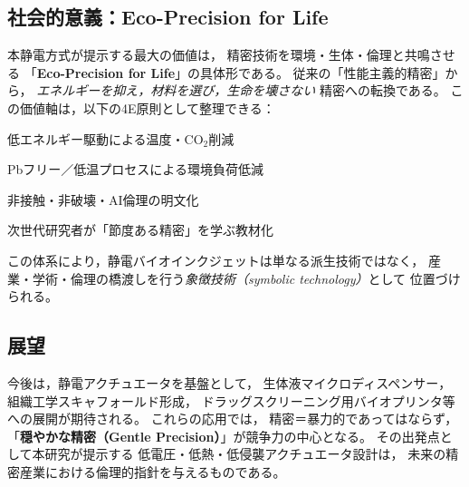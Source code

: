 \subsection{社会的意義：Eco-Precision for Life}
本静電方式が提示する最大の価値は，
精密技術を環境・生体・倫理と共鳴させる
「\textbf{Eco-Precision for Life}」の具体形である。
従来の「性能主義的精密」から，
\emph{エネルギーを抑え，材料を選び，生命を壊さない} 精密への転換である。
この価値軸は，以下の4E原則として整理できる：
\begin{description}[leftmargin=6mm,labelindent=0mm]
\item[Energy:] 低エネルギー駆動による温度・CO$_2$削減
\item[Environment:] Pbフリー／低温プロセスによる環境負荷低減
\item[Ethics:] 非接触・非破壊・AI倫理の明文化
\item[Education:] 次世代研究者が「節度ある精密」を学ぶ教材化
\end{description}

この体系により，静電バイオインクジェットは単なる派生技術ではなく，
産業・学術・倫理の橋渡しを行う\emph{象徴技術（symbolic technology）}として
位置づけられる。

\subsection{展望}
今後は，静電アクチュエータを基盤として，
生体液マイクロディスペンサー，組織工学スキャフォールド形成，
ドラッグスクリーニング用バイオプリンタ等への展開が期待される。
これらの応用では，
精密＝暴力的であってはならず，
「\textbf{穏やかな精密（Gentle Precision）}」が競争力の中心となる。
その出発点として本研究が提示する
低電圧・低熱・低侵襲アクチュエータ設計は，
未来の精密産業における倫理的指針を与えるものである。
